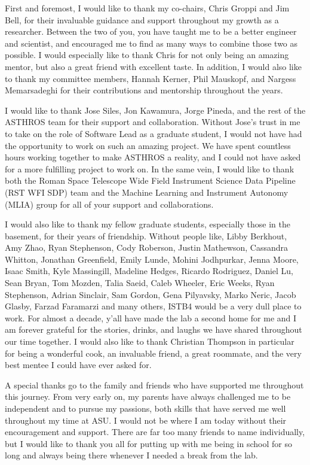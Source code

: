 First and foremost, I would like to thank my co-chairs, Chris Groppi and Jim Bell, for their invaluable guidance and support throughout my growth as a researcher.
Between the two of you, you have taught me to be a better engineer and scientist, and encouraged me to find as many ways to combine those two as possible.
I would especially like to thank Chris for not only being an amazing mentor, but also a great friend with excellent taste. 
In addition, I would also like to thank my committee members, Hannah Kerner, Phil Mauskopf, and Nargess Memarsadeghi for their contributions and mentorship throughout the years. 

I would like to thank Jose Siles, Jon Kawamura, Jorge Pineda, and the rest of the ASTHROS team for their support and collaboration.
Without Jose's trust in me to take on the role of Software Lead as a graduate student, I would not have had the opportunity to work on such an amazing project.
We have spent countless hours working together to make ASTHROS a reality, and I could not have asked for a more fulfilling project to work on.
In the same vein, I would like to thank both the Roman Space Telescope Wide Field Instrument Science Data Pipeline (RST WFI SDP) team and the Machine Learning and Instrument Autonomy (MLIA) group for all of your support and collaborations.

I would also like to thank my fellow graduate students, especially those in the basement, for their years of friendship.
Without people like, Libby Berkhout, Amy Zhao, Ryan Stephenson, Cody Roberson, Justin Mathewson, Cassandra Whitton, Jonathan Greenfield, Emily Lunde, Mohini Jodhpurkar, Jenna Moore, Isaac Smith, Kyle Massingill, Madeline Hedges, Ricardo Rodriguez, Daniel Lu, Sean Bryan, Tom Mozden, Talia Saeid, Caleb Wheeler, Eric Weeks, Ryan Stephenson, Adrian Sinclair, Sam Gordon, Gena Pilyavsky, Marko Neric, Jacob Glasby, Farzad Faramarzi and many others, ISTB4 would be a very dull place to work. 
For almost a decade, y'all have made the lab a second home for me and I am forever grateful for the stories, drinks, and laughs we have shared throughout our time together.
I would also like to thank Christian Thompson in particular for being a wonderful cook, an invaluable friend, a great roommate, and the very best mentee I could have ever asked for.

A special thanks go to the family and friends who have supported me throughout this journey. 
From very early on, my parents have always challenged me to be independent and to pursue my passions, both skills that have served me well throughout my time at ASU.
I would not be where I am today without their encouragement and support.
There are far too many friends to name individually, but I would like to thank you all for putting up with me being in school for so long and always being there whenever I needed a break from the lab.


